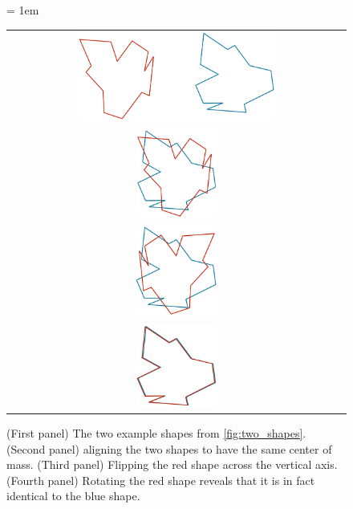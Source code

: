 \begin{figure}[p]
	\centering
	\tabcolsep = 1em
	\mySfFamily
	\begin{tabular}{c}
		\includegraphics[width = 0.6\textwidth]{../images/shape_transformation1.png}\\[2ex]
		\includegraphics[width = 0.25\textwidth]{../images/shape_transformation2.png} \\[2ex]
		\includegraphics[width = 0.25\textwidth]{../images/shape_transformation3.png}\\[2ex]
		\includegraphics[width = 0.25\textwidth]{../images/shape_transformation4.png} \\
	\end{tabular}
	\caption{(First panel) The two example shapes from \autoref{fig:two_shapes}. (Second panel) aligning the two shapes to have the same center of mass. (Third panel) Flipping the red shape across the vertical axis. (Fourth panel) Rotating the red shape reveals that it is in fact identical to the blue shape.}
	\label{fig:shape_transformation}
\end{figure}

